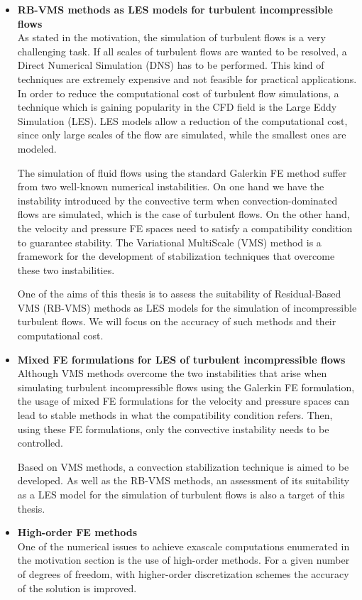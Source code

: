 \begin{itemize}
\item {\bf RB-VMS methods as LES models for turbulent incompressible flows}\\
As stated in the motivation, the simulation of turbulent flows is a very challenging task. If all scales of turbulent flows are wanted to be resolved, a Direct Numerical Simulation (DNS) has to be performed. This kind of techniques are extremely expensive and not feasible for practical applications. In order to reduce the computational cost of turbulent flow simulations, a technique which is gaining popularity in the CFD field is the Large Eddy Simulation (LES). LES models allow a reduction of the computational cost, since only large scales of the flow are simulated, while the smallest ones are modeled.

The simulation of fluid flows using the standard Galerkin FE method suffer from two well-known numerical instabilities. On one hand we have the instability introduced by the convective term when convection-dominated flows are simulated, which is the case of turbulent flows. On the other hand, the velocity and pressure FE spaces need to satisfy a compatibility condition to guarantee stability. The Variational MultiScale (VMS) method is a framework for the development of stabilization techniques that overcome these two instabilities. 

One of the aims of this thesis is to assess the suitability of Residual-Based VMS (RB-VMS) methods as LES models for the simulation of incompressible turbulent flows. We will focus on the accuracy of such methods and their computational cost.

\item {\bf Mixed FE formulations for LES of turbulent incompressible flows}\\
Although VMS methods overcome the two instabilities that arise when simulating turbulent incompressible flows using the Galerkin FE formulation, the usage of mixed FE formulations for the velocity and pressure spaces can lead to stable methods in what the compatibility condition refers. Then, using these FE formulations, only the convective instability needs to be controlled.

Based on VMS methods, a convection stabilization technique is aimed to be developed. As well as the RB-VMS methods, an assessment of its suitability as a LES model for the simulation of turbulent flows is also a target of this thesis.

\item {\bf High-order FE methods}\\
One of the numerical issues to achieve exascale computations enumerated in the motivation section is the use of high-order methods. For a given number of degrees of freedom, with higher-order discretization schemes the accuracy of the solution is improved. 


\end{itemize}
